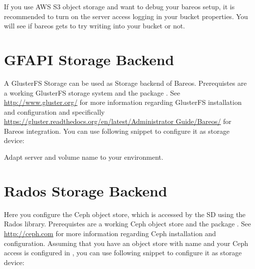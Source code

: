 If you use AWS S3 object storage and want to debug your bareos setup, it is recommended to turn on the server access logging in your bucket properties. You will see if bareos gets to try writing into your bucket or not.



\section{GFAPI Storage Backend}
\label{SdBackendGfapi}


A GlusterFS Storage can be used as Storage backend of Bareos.
Prerequistes are a working GlusterFS storage system and the package .
See \url{http://www.gluster.org/} for more information regarding GlusterFS installation and configuration
and specifically \url{https://gluster.readthedocs.org/en/latest/Administrator Guide/Bareos/}
for Bareos integration.
You can use following snippet to configure it as storage device:


Adapt server and volume name to your environment.




\section{Rados Storage Backend}
\label{SdBackendRados}


Here you configure the Ceph object store, which is accessed by the SD using the Rados library.
Prerequistes are a
working Ceph object store and the package .
See \url{http://ceph.com} for more information regarding Ceph installation and configuration.
Assuming that you have an object store with name 
and your Ceph access is configured in ,
you can use following snippet to configure it as storage device:

